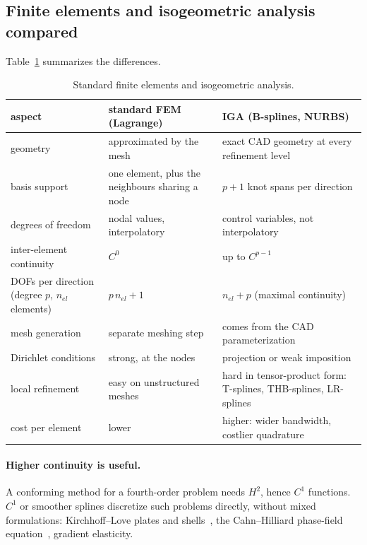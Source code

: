 \subsection{Finite elements and isogeometric analysis compared}\label{sec:var-fem-iga}
%
Table~\ref{tab:fem-iga} summarizes the differences.
\begin{table}[h]
\centering\small
\renewcommand{\arraystretch}{1.25}
\begin{tabular}{>{\raggedright}p{3.3cm}>{\raggedright}p{4.9cm}>{\raggedright\arraybackslash}p{5.9cm}}
\toprule
\sffamily aspect & \sffamily standard FEM (Lagrange) & \sffamily IGA (B-splines, NURBS)\\
\midrule
geometry & approximated by the mesh & exact CAD geometry at every refinement level\\
basis support & one element, plus the neighbours sharing a node & $p+1$ knot spans per direction\\
degrees of freedom & nodal values, interpolatory & control variables, not interpolatory\\
inter-element continuity & $C^0$ & up to $C^{p-1}$\\
DOFs per direction (degree $p$, $n_{el}$ elements) & $p\,n_{el}+1$ & $n_{el}+p$ (maximal continuity)\\
mesh generation & separate meshing step & comes from the CAD parameterization\\
Dirichlet conditions & strong, at the nodes & projection or weak imposition\\
local refinement & easy on unstructured meshes & hard in tensor-product form: T-splines, THB-splines, LR-splines\\
cost per element & lower & higher: wider bandwidth, costlier quadrature\\
\bottomrule
\end{tabular}
\caption{Standard finite elements and isogeometric analysis.}
\label{tab:fem-iga}
\end{table}

\paragraph{Higher continuity is useful.}
%
A conforming method for a fourth-order problem needs $H^2$, hence $C^1$
functions. $C^1$ or smoother splines discretize such problems directly,
without mixed formulations: Kirchhoff--Love plates and
shells~\cite{KiendlShells2009}, the Cahn--Hilliard phase-field
equation~\cite{GomezCahnHilliard2008}, gradient elasticity.

